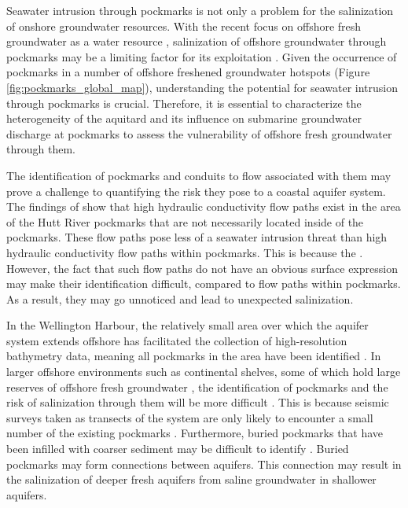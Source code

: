 \documentclass[draft, 10pt]{agujournal2019}
\begin{document}
Seawater intrusion through pockmarks is not only a problem for the salinization of onshore groundwater resources.
With the recent focus on offshore fresh groundwater as a water resource \cite{bakken_submarine_2012, zamrsky_offshore_2022}, salinization of offshore groundwater through pockmarks may be a limiting factor for its exploitation \cite{gyopari_wellington_2018}.
Given the occurrence of pockmarks in a number of offshore freshened groundwater hotspots (Figure \ref{fig:pockmarks_global_map}), understanding the potential for seawater intrusion through pockmarks is crucial.
Therefore, it is essential to characterize the heterogeneity of the aquitard and its influence on submarine groundwater discharge at pockmarks to assess the vulnerability of offshore fresh groundwater through them.

The identification of pockmarks and conduits to flow associated with them may prove a challenge to quantifying the risk they pose to a coastal aquifer system. The findings of  show that high hydraulic conductivity flow paths exist in the area of the Hutt River pockmarks that are not necessarily located inside of the pockmarks. These flow paths pose less of a seawater intrusion threat than high hydraulic conductivity flow paths within pockmarks. This is because the 
\cite{post_variable_2022}. However, the fact that such flow paths do not have an obvious surface expression may make their identification difficult, compared to flow paths within pockmarks. As a result, they may go unnoticed and lead to unexpected salinization. 

In the Wellington Harbour, the relatively small area over which the aquifer system extends offshore has facilitated the collection of high-resolution bathymetry data, meaning all pockmarks in the area have been identified \cite{hoffmann_fresh_2023}. In larger offshore environments such as continental shelves, some of which hold large reserves of offshore fresh groundwater \cite{zamrsky_offshore_2022}, the identification of pockmarks and the risk of salinization through them will be more difficult \cite{goff_modern_2019, gustafson_aquifer_2019}. This is because seismic surveys taken as transects of the system are only likely to encounter a small number of the existing pockmarks \cite{bertoni_seismic_2020}. Furthermore, buried pockmarks that have been infilled with coarser sediment may be difficult to identify  \cite{goff_modern_2019}. Buried pockmarks may form connections between aquifers. This connection may result in the salinization of deeper fresh aquifers from saline groundwater in shallower aquifers.
\end{document}
